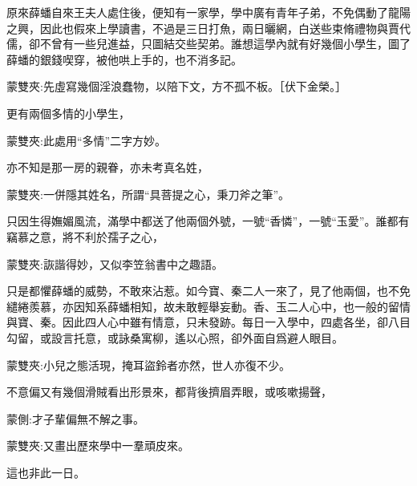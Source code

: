 \begin{parag}
    原來薛蟠自來王夫人處住後，便知有一家學，學中廣有青年子弟，不免偶動了龍陽之興，因此也假來上學讀書，不過是三日打魚，兩日曬網，白送些束脩禮物與賈代儒，卻不曾有一些兒進益，只圖結交些契弟。誰想這學內就有好幾個小學生，圖了薛蟠的銀錢喫穿，被他哄上手的，也不消多記。\begin{note}蒙雙夾:先虛寫幾個淫浪蠢物，以陪下文，方不孤不板。［伏下金榮。］\end{note}更有兩個多情的小學生，\begin{note}蒙雙夾:此處用“多情”二字方妙。\end{note}亦不知是那一房的親眷，亦未考真名姓，\begin{note}蒙雙夾:一併隱其姓名，所謂“具菩提之心，秉刀斧之筆”。\end{note}只因生得嫵媚風流，滿學中都送了他兩個外號，一號“香憐”，一號“玉愛”。誰都有竊慕之意，將不利於孺子之心，\begin{note}蒙雙夾:詼諧得妙，又似李笠翁書中之趣語。\end{note}只是都懼薛蟠的威勢，不敢來沾惹。如今寶、秦二人一來了，見了他兩個，也不免繾綣羨慕，亦因知系薛蟠相知，故未敢輕舉妄動。香、玉二人心中，也一般的留情與寶、秦。因此四人心中雖有情意，只未發跡。每日一入學中，四處各坐，卻八目勾留，或設言托意，或詠桑寓柳，遙以心照，卻外面自爲避人眼目。\begin{note}蒙雙夾:小兒之態活現，掩耳盜鈴者亦然，世人亦復不少。\end{note}不意偏又有幾個滑賊看出形景來，都背後擠眉弄眼，或咳嗽揚聲，\begin{note}蒙側:才子輩偏無不解之事。\end{note}\begin{note}蒙雙夾:又畫出歷來學中一羣頑皮來。\end{note}這也非此一日。
\end{parag}


